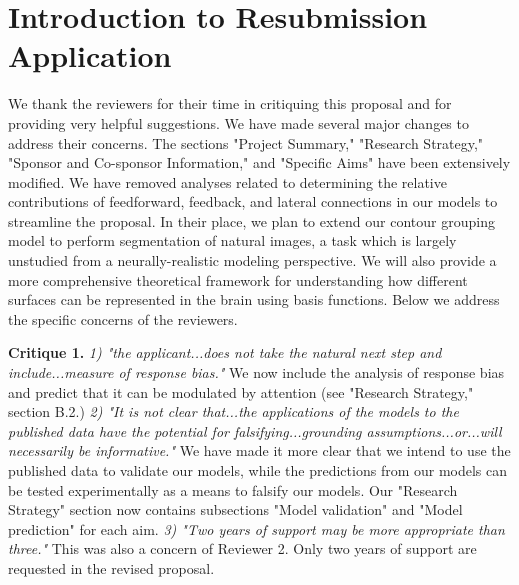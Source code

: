 \documentclass[11pt,notitlepage]{article}
\begin{document}
\thispagestyle{empty}

\sloppy %

\section*{Introduction to Resubmission Application}
We thank the reviewers for their time in critiquing this
proposal and for providing very helpful suggestions. We
have made several major changes to address their concerns.
The sections "Project Summary," "Research Strategy," "Sponsor and Co-sponsor Information," and
"Specific Aims" have been extensively modified.
%
We have removed analyses related to
determining the relative contributions of feedforward, feedback, and
lateral connections in our models
to streamline the proposal. 
In their place, we plan to extend our contour grouping model to
perform segmentation of natural images, a task which is largely
unstudied from a neurally-realistic modeling perspective. We will also
provide a more comprehensive theoretical framework for understanding
how different surfaces can be represented in the brain using basis
functions. Below we address the specific concerns of the reviewers.

\textbf{Critique 1.} \textit{1) "the applicant...does not take the
  natural next step and include...measure of response bias."}
 We now include the analysis of response bias and predict that it can
 be modulated by attention (see "Research Strategy," section B.2.)
 \textit{2) "It is not clear that...the applications
  of the models to the published data have the potential for
  falsifying...grounding assumptions...or...will necessarily be informative."} We have made it
more clear that we intend to use the published data to validate our
models, while the predictions from our models can be tested
experimentally as a means to falsify our models. Our "Research
Strategy" section now contains  subsections "Model validation" and "Model
prediction" for each aim. \textit{3) "Two years of support may be more appropriate than
  three."}
This was also a concern of Reviewer 2. Only two years of support are
requested in the revised proposal.
\end{document}
